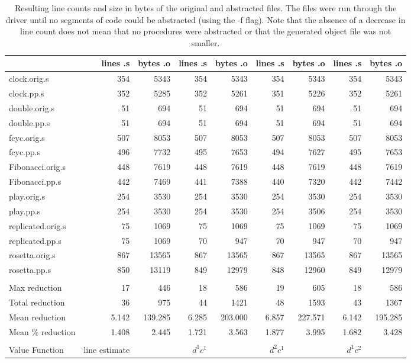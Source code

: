 \documentclass[9pt,nocopyrightspace]{sigplanconf}
\begin{document}
\begin{table}
\begin{center}
\begin{tabular}{|l|r|r|r|r|r|r|r|r|} \hline
&lines .s&bytes .o&lines .s&bytes .o&lines .s&bytes .o&lines .s&bytes .o\\ \hline
clock.orig.s&354&5343&354&5343&354&5343&354&5343\\ \hline
clock.pp.s&352&5285&352&5261&351&5226&352&5261\\ \hline
double.orig.s&51&694&51&694&51&694&51&694\\ \hline
double.pp.s&51&694&51&694&51&694&51&694\\ \hline
fcyc.orig.s&507&8053&507&8053&507&8053&507&8053\\ \hline
fcyc.pp.s&496&7732&495&7653&494&7627&495&7653\\ \hline
Fibonacci.orig.s&448&7619&448&7619&448&7619&448&7619\\ \hline
Fibonacci.pp.s&442&7469&441&7388&440&7320&442&7442\\ \hline
play.orig.s&254&3530&254&3530&254&3530&254&3530\\ \hline
play.pp.s&254&3530&254&3530&254&3506&254&3530\\ \hline
replicated.orig.s&75&1069&75&1069&75&1069&75&1069\\ \hline
replicated.pp.s&75&1069&70&947&70&947&70&947\\ \hline
rosetta.orig.s&867&13565&867&13565&867&13565&867&13565\\ \hline
rosetta.pp.s&850&13119&849&12979&848&12960&849&12979\\ \hline
&&&&&&&&\\ \hline
Max reduction&17&446&18&586&19&605&18&586\\ \hline
Total reduction&36&975&44&1421&48&1593&43&1367\\ \hline
Mean reduction&5.142&139.285&6.285&203.000&6.857&227.571&6.142&195.285\\ \hline
Mean \% reduction&1.408&2.445&1.721&3.563&1.877&3.995&1.682&3.428\\ \hline
&&&&&&&&\\ \hline
Value Function&line estimate&&$d^{1} c^{1}$&&$d^{2} c^{1}$&&$d^{1} c^{2}$&\\ \hline
\end{tabular}
\caption{Resulting line counts and size in bytes of the original and abstracted files. The files were run through the driver until no segments of code could be abstracted (using the -f flag). Note that the absence of a decrease in line count does not mean that no procedures were abstracted or that the generated object file was not smaller.}
\end{center}
\end{table}
\end{document}
